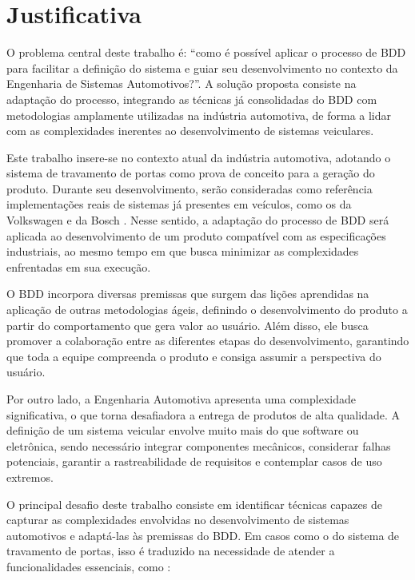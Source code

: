 \section{\textbf{Justificativa}}

O problema central deste trabalho é: ``como é possível aplicar o processo de BDD para facilitar a definição do sistema e guiar seu desenvolvimento no contexto da 
Engenharia de Sistemas Automotivos?''. A solução proposta consiste na adaptação do processo, integrando as técnicas já consolidadas do BDD com metodologias 
amplamente utilizadas na indústria automotiva, de forma a lidar com as complexidades inerentes ao desenvolvimento de sistemas veiculares.

Este trabalho insere-se no contexto atual da indústria automotiva, adotando o sistema de travamento de portas como prova de conceito para a geração do produto. 
Durante seu desenvolvimento, serão consideradas como referência implementações reais de sistemas já presentes em veículos, como os da Volkswagen \cite{vwLocking} 
e da Bosch \cite{bosch2022handbook,reif2017locking}. Nesse sentido, a adaptação do processo de BDD será aplicada ao desenvolvimento de um produto compatível com 
as especificações industriais, ao mesmo tempo em que busca minimizar as complexidades enfrentadas em sua execução.

O BDD incorpora diversas premissas que surgem das lições aprendidas na aplicação de outras metodologias ágeis, definindo o desenvolvimento do produto a partir do 
comportamento que gera valor ao usuário. Além disso, ele busca promover a colaboração entre as diferentes etapas do desenvolvimento, garantindo que toda a equipe 
compreenda o produto e consiga assumir a perspectiva do usuário.

Por outro lado, a Engenharia Automotiva apresenta uma complexidade significativa, o que torna desafiadora a entrega de produtos de alta qualidade. A definição de 
um sistema veicular envolve muito mais do que software ou eletrônica, sendo necessário integrar componentes mecânicos, considerar falhas 
potenciais, garantir a rastreabilidade de requisitos e contemplar casos de uso extremos.

O principal desafio deste trabalho consiste em identificar técnicas capazes de capturar as complexidades envolvidas no desenvolvimento de sistemas automotivos 
e adaptá-las às premissas do BDD. Em casos como o do sistema de travamento de portas, isso é traduzido na necessidade de atender a funcionalidades 
essenciais, como \cite{bosch2022handbook}:

